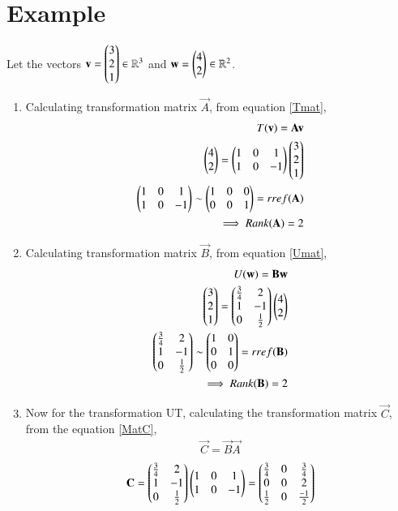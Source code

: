 \documentclass[journal,12pt,twocolumn]{IEEEtran}
\begin{document}
\section{Example}
Let the vectors $\mathbf{v}=\begin{pmatrix}3\\2\\1\end{pmatrix} \in \mathbb{R}^3$ and $\mathbf{w}=\begin{pmatrix}4\\2\end{pmatrix} \in \mathbb{R}^2$.
\begin{enumerate}
\item Calculating transformation matrix $\vec{A}$, from equation \eqref{Tmat}, 
\begin{align}
T(\mathbf{v})=\mathbf{A}\mathbf{v}\\
\begin{pmatrix}4\\2\end{pmatrix}=\begin{pmatrix}1&0&1\\1&0&-1\end{pmatrix}\begin{pmatrix}3\\2\\1\end{pmatrix}\\
\begin{pmatrix}1&0&1\\1&0&-1\end{pmatrix} \sim \begin{pmatrix}1&0&0\\0&0&1\end{pmatrix}=rref(\mathbf{A})\\
\implies Rank(\mathbf{A})=2 \label{RankA}
\end{align}
\item Calculating transformation matrix $\vec{B}$, from equation \eqref{Umat}, 
\begin{align}
U(\mathbf{w})=\mathbf{B}\mathbf{w}\\
\begin{pmatrix}3\\2\\1\end{pmatrix}=\begin{pmatrix}\frac{3}{4}&2\\1&-1\\0&\frac{1}{2}\end{pmatrix}\begin{pmatrix}4\\2\end{pmatrix}\\
\begin{pmatrix}\frac{3}{4}&2\\1&-1\\0&\frac{1}{2}\end{pmatrix} \sim \begin{pmatrix}1&0\\0&1\\0&0\end{pmatrix}=rref(\mathbf{B})\\
\implies Rank(\mathbf{B})=2 \label{RankB}
\end{align}
\item Now for the transformation UT, calculating the transformation matrix $\vec{C}$, from the equation \eqref{MatC},
\begin{align}
\vec{C}=\vec{B}\vec{A}
\end{align}
\begin{align}
\vec{C}=\myvec{\frac{3}{4}&2\\1&-1\\0&\frac{1}{2}}\myvec{1&0&1\\1&0&-1}=\myvec{\frac{3}{4}&0&\frac{3}{4}\\0&0&2\\\frac{1}{2}&0&\frac{-1}{2}}\\

\end{align}
\end{enumerate}
\end{document}

